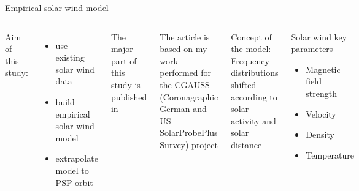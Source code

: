 \begin{frame}[plain,c]{Empirical solar wind model}{}
	\begin{columns}[c]
		
		Aim of this study:
		\begin{itemize}
			\item use existing solar wind data
			\item build empirical solar wind model
			\item extrapolate model to PSP orbit
		\end{itemize}
		\vspace{1cm}
		The major part of this study is published in \citet{Venzmer2018}\\\ 
		
		The article is based on my work performed for the CGAUSS (Coronagraphic German and US SolarProbePlus Survey) project

		
		Concept of the model:\\
		Frequency distributions shifted according to solar activity and solar distance
		\vspace{5mm}
		
		\begin{block}{Solar wind key parameters}
			\begin{itemize}
				\item Magnetic field strength
				\item Velocity
				\item Density
				\item Temperature
			\end{itemize}
		\end{block}
		
	\end{columns}
\end{frame}

